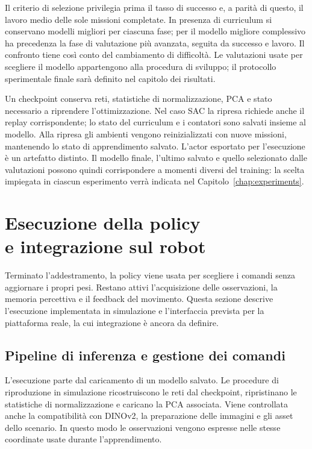 Il criterio di selezione privilegia prima il tasso di successo e, a parità di questo, il lavoro medio delle sole missioni completate. In presenza di curriculum si conservano modelli migliori per ciascuna fase; per il modello migliore complessivo ha precedenza la fase di valutazione più avanzata, seguita da successo e lavoro. Il confronto tiene così conto del cambiamento di difficoltà. Le valutazioni usate per scegliere il modello appartengono alla procedura di sviluppo; il protocollo sperimentale finale sarà definito nel capitolo dei risultati.

Un checkpoint conserva reti, statistiche di normalizzazione, PCA e stato necessario a riprendere l'ottimizzazione. Nel caso SAC la ripresa richiede anche il replay corrispondente; lo stato del curriculum e i contatori sono salvati insieme al modello. Alla ripresa gli ambienti vengono reinizializzati con nuove missioni, mantenendo lo stato di apprendimento salvato. L'actor esportato per l'esecuzione è un artefatto distinto. Il modello finale, l'ultimo salvato e quello selezionato dalle valutazioni possono quindi corrispondere a momenti diversi del training: la scelta impiegata in ciascun esperimento verrà indicata nel Capitolo~\ref{chap:experiments}.

\section[Esecuzione della policy e integrazione sul robot]{Esecuzione della policy\\e integrazione sul robot}
\label{sec:metodo-esecuzione}

Terminato l'addestramento, la policy viene usata per scegliere i comandi senza aggiornare i propri pesi. Restano attivi l'acquisizione delle osservazioni, la memoria percettiva e il feedback del movimento. Questa sezione descrive l'esecuzione implementata in simulazione e l'interfaccia prevista per la piattaforma reale, la cui integrazione è ancora da definire.

\subsection{Pipeline di inferenza e gestione dei comandi}

L'esecuzione parte dal caricamento di un modello salvato. Le procedure di riproduzione in simulazione ricostruiscono le reti dal checkpoint, ripristinano le statistiche di normalizzazione e caricano la PCA associata. Viene controllata anche la compatibilità con DINOv2, la preparazione delle immagini e gli asset dello scenario. In questo modo le osservazioni vengono espresse nelle stesse coordinate usate durante l'apprendimento.

